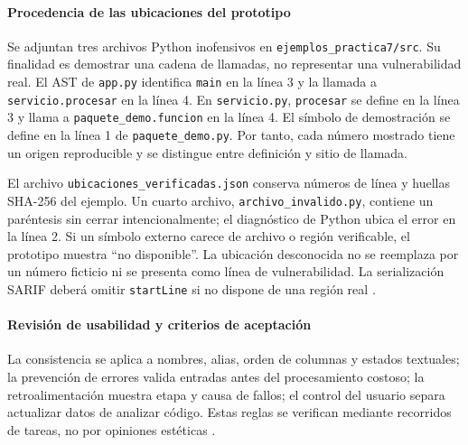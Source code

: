 \paragraph*{Procedencia de las ubicaciones del prototipo}
Se adjuntan tres archivos Python inofensivos en \texttt{ejemplos\_\allowbreak practica7/\allowbreak src}. Su finalidad es demostrar una cadena de llamadas, no representar una vulnerabilidad real. El AST de \texttt{app.\allowbreak py} identifica \texttt{main} en la línea 3 y la llamada a \texttt{servicio.\allowbreak procesar} en la línea 4. En \texttt{servicio.\allowbreak py}, \texttt{procesar} se define en la línea 3 y llama a \texttt{paquete\_\allowbreak demo.\allowbreak funcion} en la línea 4. El símbolo de demostración se define en la línea 1 de \texttt{paquete\_\allowbreak demo.\allowbreak py}. Por tanto, cada número mostrado tiene un origen reproducible y se distingue entre definición y sitio de llamada.

El archivo \texttt{ubicaciones\_\allowbreak verificadas.\allowbreak json} conserva números de línea y huellas SHA-256 del ejemplo. Un cuarto archivo, \texttt{archivo\_\allowbreak invalido.\allowbreak py}, contiene un paréntesis sin cerrar intencionalmente; el diagnóstico de Python ubica el error en la línea 2. Si un símbolo externo carece de archivo o región verificable, el prototipo muestra ``no disponible''. La ubicación desconocida no se reemplaza por un número ficticio ni se presenta como línea de vulnerabilidad. La serialización SARIF deberá omitir \texttt{startLine} si no dispone de una región real \parencite{oasis2019sarif}.
\paragraph*{Revisión de usabilidad y criterios de aceptación}
La consistencia se aplica a nombres, alias, orden de columnas y estados textuales; la prevención de errores valida entradas antes del procesamiento costoso; la retroalimentación muestra etapa y causa de fallos; el control del usuario separa actualizar datos de analizar código. Estas reglas se verifican mediante recorridos de tareas, no por opiniones estéticas \parencite{torres2026proyecto,pressman2020software}.


